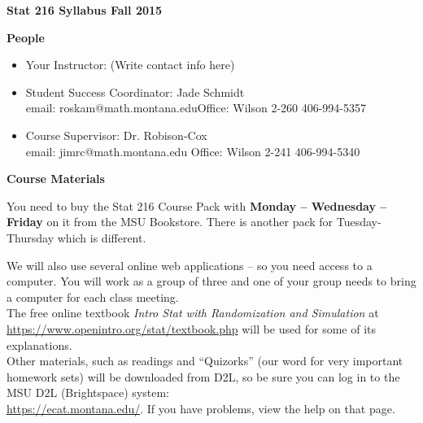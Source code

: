 \setcounter{page}{1}

\def\theTopic{Intro \& Syllabus }
\def\dayNum{1}


\begin{center}
\vspace*{.1in}
{\bf {\large Stat 216 Syllabus Fall 2015}}\\
\end{center}
\vspace{-.1in}

\begin{center}
  {\bf People}
\end{center}
\begin{itemize}
\item Your Instructor: (Write contact info here) \vspace{5.5cm}
\item Student Success Coordinator:  Jade Schmidt\\
     email: roskam@math.montana.edu\hfill Office: Wilson 2-260 \hfill
     406-994-5357
   \item Course Supervisor: Dr. Robison-Cox\\
     email: jimrc@math.montana.edu \hfill  Office: Wilson 2-241 \hfill
     406-994-5340
\end{itemize}


\begin{center}
  {\bf Course Materials}
\end{center}
  You need to buy the Stat 216  Course Pack with {\bf Monday --
    Wednesday -- Friday} on it from the MSU
  Bookstore.  There is another pack for Tuesday-Thursday which is different.

  We will also use several online web applications -- so you need
  access to a computer.  You will work as a group of three and one of
  your group needs to bring a computer for each class meeting.\\
  The free online textbook {\it Intro Stat with Randomization and
    Simulation} at \url{https://www.openintro.org/stat/textbook.php}
  will be used for some of its explanations.\\
  Other materials, such as readings and ``Quizorks'' (our word for
  very important homework sets) will be downloaded from D2L, so be
  sure you can log in to the MSU D2L (Brightspace) system:\\
   \url{https://ecat.montana.edu/}.  If you have problems, view the
   help on that page.
\newpage


